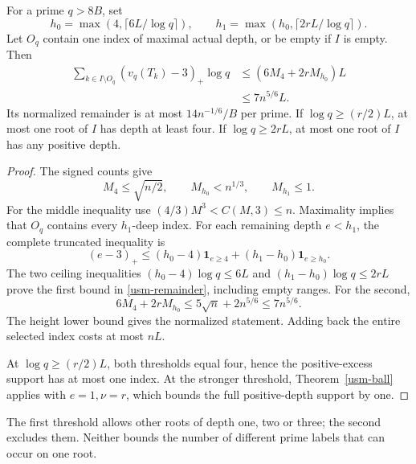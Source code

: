 \begin{theorem}
\label{usm-one-owner}
For a prime \(q>8B\), set
\[
 h_0=\max(4,\lceil6L/\log q\rceil),\qquad
 h_1=\max(h_0,\lceil2rL/\log q\rceil).
\]
Let \(O_q\) contain one index of maximal actual depth, or be empty
if \(I\) is empty. Then
\begin{equation}\label{usm-remainder}
 \begin{split}
 \sum_{k\in I\setminus O_q}(v_q(T_k)-3)_+\log q
 &\leq(6M_4+2rM_{h_0})L\\
 &\leq7n^{5/6}L .
 \end{split}
\end{equation}
Its normalized remainder is at most \(14n^{-1/6}/B\) per prime.
If \(\log q\geq(r/2)L\), at most one root of \(I\) has depth at
least four. If \(\log q\geq2rL\), at most one root of \(I\) has
any positive depth.
\end{theorem}
\begin{proof}
The signed counts give
\[
 M_4\leq\sqrt{n/2},\qquad M_{h_0}<n^{1/3},\qquad M_{h_1}\leq1.
\]
For the middle inequality use
\((4/3)M^3<C(M,3)\leq n\). Maximality implies that \(O_q\)
contains every \(h_1\)-deep index. For each remaining depth
\(e<h_1\), the complete truncated inequality is
\[
 (e-3)_+\leq(h_0-4)\boldsymbol1_{e\geq4}
              +(h_1-h_0)\boldsymbol1_{e\geq h_0}.
\]
The two ceiling inequalities
\((h_0-4)\log q\leq6L\) and
\((h_1-h_0)\log q\leq2rL\) prove the first bound in
\eqref{usm-remainder}, including empty ranges. For the second,
\[
 6M_4+2rM_{h_0}\leq5\sqrt n+2n^{5/6}\leq7n^{5/6}.
\]
The height lower bound gives the normalized statement. Adding
back the entire selected index costs at most \(nL\).

At \(\log q\geq(r/2)L\), both thresholds equal four, hence the
positive-excess support has at most one index. At the stronger
threshold, Theorem~\ref{usm-ball} applies with \(e=1,\nu=r\),
which bounds the full positive-depth support by one.
\end{proof}
The first threshold allows other roots of depth one, two or three;
the second excludes them. Neither bounds the number of different
prime labels that can occur on one root.

